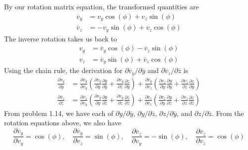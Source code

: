 \documentclass[a4paper]{article}
\begin{document}
By our rotation matrix equation, the transformed quantities are
\begin{align*}
	\overline{v}_{y} & = v_{y}\cos\!\left(\phi\right) + v_{z}\sin\!\left(\phi\right) \\
	\overline{v}_{z} & = -v_{y}\sin\!\left(\phi\right) + v_{z}\cos\!\left(\phi\right)
\end{align*}
The inverse rotation takes us back to
\begin{align*}
	v_{y} & = \overline{v}_{y}\cos\!\left(\phi\right) - \overline{v}_{z}\sin\!\left(\phi\right) \\
	v_{z} & = \overline{v}_{y}\sin\!\left(\phi\right) + \overline{v}_{z}\cos\!\left(\phi\right)
\end{align*}
Using the chain rule, the derivation for \( \partial \overline{v}_{y} / \partial \overline{y} \) and \( \partial \overline{v}_{z} / \partial \overline{z} \) is
\begin{align*}
	\frac{\partial \overline{v}_{y}}{\partial \overline{y}} & = \frac{\partial \overline{v}_{y}}{\partial v_{y}}\!\left( \frac{\partial v_{y}}{\partial y}\frac{\partial y}{\partial \overline{y}} + \frac{\partial v_{y}}{\partial z}\frac{\partial z}{\partial \overline{y}} \right) + \frac{\partial \overline{v}_{y}}{\partial v_{z}}\!\left( \frac{\partial v_{z}}{\partial y}\frac{\partial y}{\partial \overline{y}} + \frac{\partial v_{z}}{\partial z}\frac{\partial z}{\partial \overline{y}} \right) \\
	\frac{\partial \overline{v}_{z}}{\partial \overline{z}} & = \frac{\partial \overline{v}_{z}}{\partial v_{y}}\!\left( \frac{\partial v_{y}}{\partial y} \frac{\partial y}{\partial \overline{z}} + \frac{\partial v_{y}}{\partial z}\frac{\partial z}{\partial \overline{z}} \right) + \frac{\partial \overline{v}_{z}}{\partial v_{z}}\!\left( \frac{\partial v_{z}}{\partial y}\frac{\partial y}{\partial \overline{z}} + \frac{\partial v_{z}}{\partial z}\frac{\partial z}{\partial \overline{z}} \right)
\end{align*}
From problem 1.14, we have each of \( \partial y / \partial \overline{y} \), \( \partial y / \partial \overline{z} \), \( \partial z / \partial \overline{y} \), and \( \partial z / \partial \overline{z} \). From the rotation equations above, we also have
\[
	\frac{\partial \overline{v}_{y}}{\partial v_{y}} = \cos\!\left(\phi\right), \quad \frac{\partial \overline{v}_{y}}{\partial v_{z}} = \sin\!\left(\phi\right), \quad \frac{\partial \overline{v}_{z}}{\partial v_{y}} = -\sin\!\left(\phi\right), \quad \frac{\partial \overline{v}_{z}}{\partial v_{z}} = \cos\!\left(\phi\right)
\]
\end{document}
